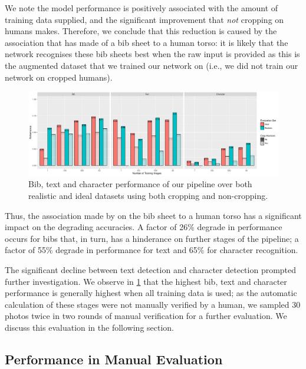 We note the model performance is positively associated with the amount of training data supplied, and the significant improvement that \textit{not} cropping on humans makes. Therefore, we conclude that this reduction is caused by the association that \frcnn{} has made of a bib sheet to a human torso: it is likely that the network recognises these bib sheets best when the raw input is provided as this is the augmented dataset that we trained our network on (i.e., we did not train our network on cropped humans).

\begin{landscape}

\begin{figure}
  \centering
  \includegraphics[width=1.15\paperwidth]{images/evaluation/DetectionAll}
  \caption[Bib, text and character performance]{Bib, text and character performance of our pipeline over both realistic and ideal datasets using both cropping and non-cropping.}
  \label{fig:evaluation:results:performance_all}
\end{figure}

\end{landscape}

Thus, the association made by \frcnn{} on the bib sheet to a human torso has a significant impact on the degrading accuracies. A factor of 26\% degrade in performance occurs for bibs that, in turn, has a hinderance on further stages of the pipeline; a factor of 55\% degrade in performance for text and 65\% for character recognition.

The significant decline between text detection and character detection prompted further investigation. We observe in \cref{fig:evaluation:results:performance_all} that the highest bib, text and character performance is generally highest when all training data is used; as the automatic calculation of these stages were not manually verified by a human, we sampled 30 photos twice in two rounds of manual verification for a further evaluation. We discuss this evaluation in the following section.

\subsection{Performance in Manual Evaluation}


